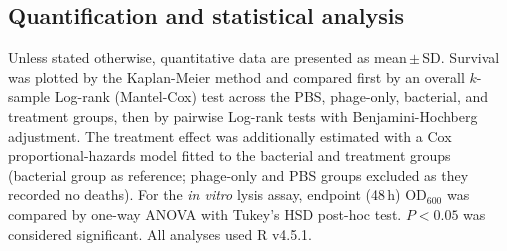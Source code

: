 \subsection*{Quantification and statistical analysis}
Unless stated otherwise, quantitative data are presented as mean\,$\pm$\,SD.
Survival was plotted by the Kaplan-Meier method and compared first by an overall
$k$-sample Log-rank (Mantel-Cox) test across the PBS, phage-only, bacterial, and
treatment groups, then by pairwise Log-rank tests with Benjamini-Hochberg
adjustment. The treatment effect was additionally estimated with a Cox
proportional-hazards model fitted to the bacterial and treatment groups (bacterial
group as reference; phage-only and PBS groups excluded as they recorded no deaths).
For the \emph{in vitro} lysis assay, endpoint (48\,h) $\mathrm{OD}_{600}$ was
compared by one-way ANOVA with Tukey's HSD post-hoc test. $P < 0.05$ was considered
significant. All analyses used R v4.5.1.
